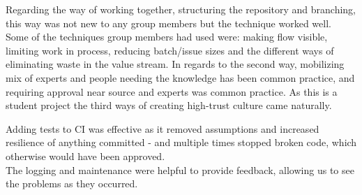 Regarding the way of working together, structuring the repository and branching, this way was not new to any group members but the technique worked well. Some of the techniques group members had used were: making flow visible, limiting work in process, reducing batch/issue sizes and the different ways of eliminating waste in the value stream. In regards to the second way, mobilizing mix of experts and people needing the knowledge has been common practice, and requiring approval near source and experts was common practice. As this is a student project the third ways of creating high-trust culture came naturally.

Adding tests to CI was effective as it removed assumptions and increased resilience of anything committed - and multiple times stopped broken code, which otherwise would have been approved. \\
The logging and maintenance were helpful to provide feedback, allowing us to see the problems as they occurred.
